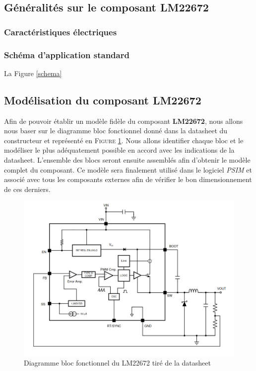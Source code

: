 			\subsection{Généralités sur le composant LM22672}
			
				\subsubsection{Caractéristiques électriques}
			
				\subsubsection{Schéma d'application standard}
				
				La Figure \ref{schema}
				
			\subsection{Modélisation du composant LM22672}
			
				Afin de pouvoir établir un modèle fidèle du composant \textbf{LM22672}, nous allons nous baser sur le diagramme bloc fonctionnel donné dans la datasheet du constructeur et représenté en \textsc{Figure \ref{func_bloc_lm22672}}. Nous allons identifier chaque bloc et le modéliser le plus adéquatement possible en accord avec les indications de la datasheet. L'ensemble des blocs seront ensuite assemblés afin d'obtenir le modèle complet du composant. Ce modèle sera finalement utilisé dans le logiciel \textit{PSIM} et associé avec tous les composants externes afin de vérifier le bon dimensionnement de ces derniers.
				
				\begin{figure}[h]
					\begin{center}
						\includegraphics[scale=0.5]{../Illus/func_bloc_lm22672.png}
					\end{center}
					\caption{Diagramme bloc fonctionnel du LM22672 tiré de la datasheet \cite{LM22672}}
					\label{func_bloc_lm22672}
				\end{figure}
				
